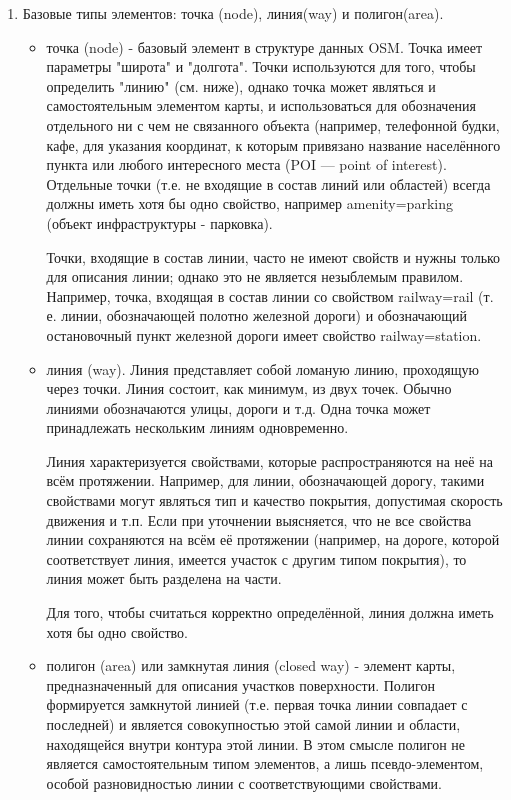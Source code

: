 \documentclass[12pt,a4paper,oneside]{article} %
\begin{document}
\begin{enumerate}
\item Базовые типы элементов: точка (node), линия(way) и полигон(area).
\begin{itemize}
\item точка (node) - базовый элемент в структуре данных OSM. Точка имеет параметры "широта" и "долгота". Точки используются для того, чтобы определить "линию" (см. ниже), однако точка может являться и самостоятельным элементом карты, и использоваться для обозначения отдельного ни с чем не связанного объекта (например, телефонной будки, кафе, для указания координат, к которым привязано название населённого пункта или любого интересного места (POI — point of interest). Отдельные точки (т.е. не входящие в состав линий или областей) всегда должны иметь хотя бы одно свойство, например amenity=parking (объект инфраструктуры - парковка).

    Точки, входящие в состав линии, часто не имеют свойств и нужны только для описания линии; однако это не является незыблемым правилом. Например, точка, входящая в состав линии со свойством railway=rail (т. е. линии, обозначающей полотно железной дороги) и обозначающий остановочный пункт железной дороги имеет свойство railway=station.


\item линия (way). Линия представляет собой ломаную линию, проходящую через точки. Линия состоит, как минимум, из двух точек. Обычно линиями обозначаются улицы, дороги и т.д. Одна точка может принадлежать нескольким линиям одновременно.

    Линия характеризуется свойствами, которые распространяются на неё на всём протяжении. Например, для линии, обозначающей дорогу, такими свойствами могут являться тип и качество покрытия, допустимая скорость движения и т.п. Если при уточнении выясняется, что не все свойства линии сохраняются на всём её протяжении (например, на дороге, которой соответствует линия, имеется участок с другим типом покрытия), то линия может быть разделена на части.

    Для того, чтобы считаться корректно определённой, линия должна иметь хотя бы одно свойство.

\item полигон (area) или замкнутая линия (closed way) - элемент карты, предназначенный для описания участков поверхности. Полигон формируется замкнутой линией  (т.е. первая точка линии совпадает с последней) и является совокупностью этой самой линии и области, находящейся внутри контура этой линии. В этом смысле полигон не является самостоятельным типом элементов, а лишь псевдо-элементом, особой разновидностью линии с соответствующими свойствами.


\end{itemize}
\end{enumerate}
\end{document}
